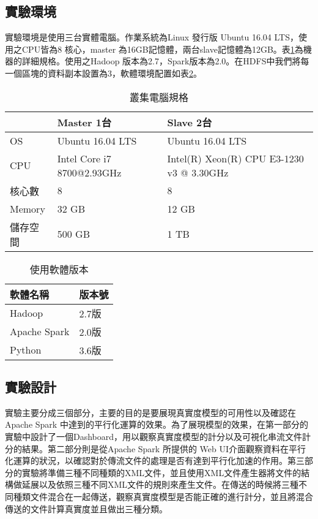 \subsection{實驗環境}
實驗環境是使用三台實體電腦。作業系統為Linux 發行版 Ubuntu 16.04 LTS，使用之CPU皆為8 核心，master 為16GB記憶體，兩台slave記憶體為12GB。表\ref{cluster}為機器的詳細規格。使用之Hadoop 版本為2.7，Spark版本為2.0。在HDFS中我們將每一個區塊的資料副本設置為3，軟體環境配置如表\ref{software}。
\begin{table}[H]
\begin{center}
\caption{叢集電腦規格}
\label{cluster}
\begin{tabular}{|p{3cm}<{\centering}|p{3cm}<{\centering}|p{3cm}<{\centering}|}
\hline
&Master 1台&Slave 2台\\
\hline
OS&Ubuntu 16.04 LTS&Ubuntu 16.04 LTS\\
\hline
CPU&Intel Core i7 8700@2.93GHz&Intel(R) Xeon(R) CPU E3-1230 v3 @ 3.30GHz\\
\hline
核心數&8&8\\
\hline
Memory&32 GB&12 GB\\
\hline
儲存空間&500 GB&1 TB\\
\hline
\end{tabular}
\end{center}
\end{table}

\begin{table}[H]
\caption{使用軟體版本}
\label{software}
\begin{center}
\begin{tabular}{|p{3cm}<{\centering}|p{3cm}<{\centering}|}
\hline
軟體名稱 & 版本號\\
\hline
Hadoop & 2.7版\\
\hline
Apache Spark &2.0版\\
\hline
Python & 3.6版\\
\hline
\end{tabular}
\end{center}
\end{table}

\newpage
\subsection{實驗設計}
實驗主要分成三個部分，主要的目的是要展現真實度模型的可用性以及確認在Apache Spark 中達到的平行化運算的效果。為了展現模型的效果，在第一部分的實驗中設計了一個Dashboard，用以觀察真實度模型的計分以及可視化串流文件計分的結果。第二部分則是從Apache Spark 所提供的 Web UI介面觀察資料在平行化運算的狀況，以確認對於傳流文件的處理是否有達到平行化加速的作用。第三部分的實驗將準備三種不同種類的XML文件，並且使用XML文件產生器將文件的結構做延展以及依照三種不同XML文件的規則來產生文件。在傳送的時候將三種不同種類文件混合在一起傳送，觀察真實度模型是否能正確的進行計分，並且將混合傳送的文件計算真實度並且做出三種分類。\\\par


